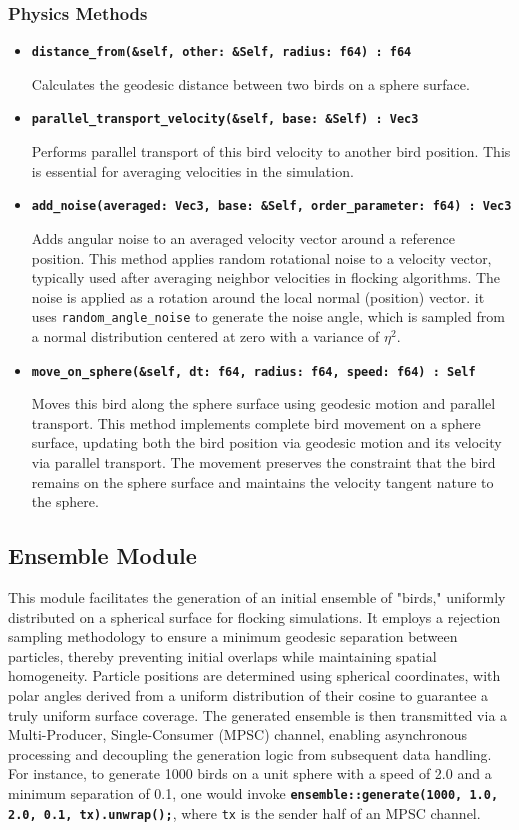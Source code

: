 \documentclass[12pt,a4paper]{article}
\begin{document}
\subsubsection{Physics Methods}
\begin{itemize}
    \item \textbf{\texttt{distance\_from(\&self, other: \&Self, radius: f64) : f64}}
    
    Calculates the geodesic distance between two birds on a sphere surface.
    \item \textbf{\texttt{parallel\_transport\_velocity(\&self, base: \&Self) : Vec3}}
    
    Performs parallel transport of this bird velocity to another bird position. This is essential for averaging velocities in the simulation.

    \item \textbf{\texttt{add\_noise(averaged: Vec3, base: \&Self, order\_parameter: f64) : Vec3}}
    
    Adds angular noise to an averaged velocity vector around a reference position. This method applies random rotational noise to a velocity vector, typically used after averaging neighbor velocities in flocking algorithms. The noise is applied as a rotation around the local normal (position) vector. it uses \texttt{random\_angle\_noise} to generate the noise angle, which is sampled from a normal distribution centered at zero with a variance of \(\eta^2\).

    \item \textbf{\texttt{move\_on\_sphere(\&self, dt: f64, radius: f64, speed: f64) : Self}}
    
    Moves this bird along the sphere surface using geodesic motion and parallel transport. This method implements complete bird movement on a sphere surface, updating both the bird position via geodesic motion and its velocity via parallel transport. The movement preserves the constraint that the bird remains on the sphere surface and maintains the velocity tangent nature to the sphere.
\end{itemize}

\subsection{Ensemble Module}
This module facilitates the generation of an initial ensemble of "birds," uniformly distributed on a spherical surface for flocking simulations. It employs a rejection sampling methodology to ensure a minimum geodesic separation between particles, thereby preventing initial overlaps while maintaining spatial homogeneity. Particle positions are determined using spherical coordinates, with polar angles derived from a uniform distribution of their cosine to guarantee a truly uniform surface coverage. The generated ensemble is then transmitted via a Multi-Producer, Single-Consumer (MPSC) channel, enabling asynchronous processing and decoupling the generation logic from subsequent data handling. For instance, to generate 1000 birds on a unit sphere with a speed of 2.0 and a minimum separation of 0.1, one would invoke \textbf{\texttt{ensemble::generate(1000, 1.0, 2.0, 0.1, tx).unwrap();}}, where \texttt{tx} is the sender half of an MPSC channel.
\end{document}
